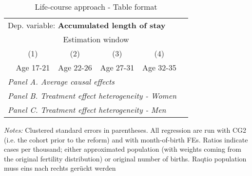  \begin{table}[H] \centering \begin{threeparttable} \caption{Life-course approach - Table format} {\def\sym#1{\ifmmode^{#1}\else\(^{#1}\)\fi} \begin{tabular}{l*{5}{c}} \toprule \multicolumn{5}{l}{Dep. variable: \textbf{Accumulated length of stay}} \\ & \multicolumn{4}{c}{Estimation window} \\ \cmidrule(lr){2-5}
            &\multicolumn{1}{c}{(1)}&\multicolumn{1}{c}{(2)}&\multicolumn{1}{c}{(3)}&\multicolumn{1}{c}{(4)}\\
            &\multicolumn{1}{c}{Age 17-21}&\multicolumn{1}{c}{Age 22-26}&\multicolumn{1}{c}{Age 27-31}&\multicolumn{1}{c}{Age 32-35}\\
\midrule
 \multicolumn{5}{l}{\emph{Panel A. Average causal effects}} \\      \midrule\multicolumn{5}{l}{\emph{Panel B. Treatment effect heterogeneity - Women}} \\      \midrule\multicolumn{5}{l}{\emph{Panel C. Treatment effect heterogeneity - Men}} \\      
\bottomrule \end{tabular} } \begin{tablenotes} \item \scriptsize \emph{Notes:} Clustered standard errors in parentheses. All regression are run with CG2 (i.e. the cohort prior to the reform) and with month-of-birth FEs. Ratios indicate cases per thousand; either approximated population (with weights coming from the original fertility distribution) or original number of births. Raqtio population muss eins nach rechts gerückt werden \end{tablenotes} \end{threeparttable} \end{table} 
